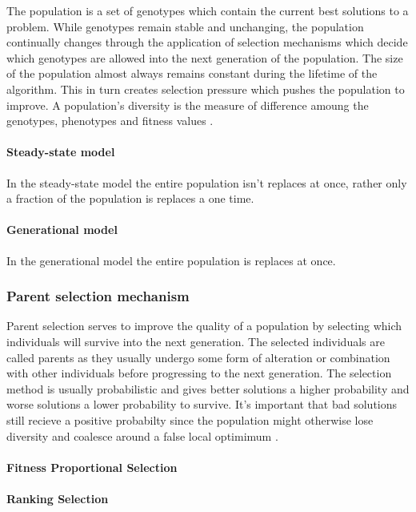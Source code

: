 The population is a set of genotypes which contain the current best solutions to a problem. While genotypes remain stable and unchanging, the population continually changes through the application of selection mechanisms which decide which genotypes are allowed into the next generation of the population. The size of the population almost always remains constant during the lifetime of the algorithm. This in turn creates selection pressure which pushes the population to improve. A population's diversity is the measure of difference amoung the genotypes, phenotypes and fitness values \cite{Eiben2015_whatevolutionary}.

\paragraph{Steady-state model}

In the steady-state model the entire population isn't replaces at once, rather only a fraction of the population is replaces a one time.

\paragraph{Generational model}

In the generational model the entire population is replaces at once.

\subsubsection{Parent selection mechanism}

Parent selection serves to improve the quality of a population by selecting which individuals will survive into the next generation. The selected individuals are called parents as they usually undergo some form of alteration or combination with other individuals before progressing to the next generation. The selection method is usually probabilistic and gives better solutions a higher probability and worse solutions a lower probability to survive. It's important that bad solutions still recieve a positive probabilty since the population might otherwise lose diversity and coalesce around a false local optimimum \cite{Eiben2015_whatevolutionary}.

\paragraph{Fitness Proportional Selection}

\paragraph{Ranking Selection}

